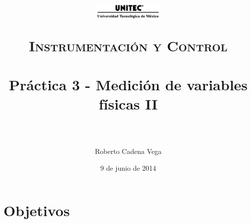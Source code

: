 



\title{	
	\normalfont \normalsize
	\begin{figure}[h]
		\begin{center}
			\includegraphics[width=0.3\textwidth]{../images/UNITEC.png} %
		\end{center}
	\end{figure}
	\textsc{Instrumentación y Control} \\ [25pt]
	\horrule{0.5pt} \\[0.4cm] %
	\huge Práctica 3 - Medición de variables físicas II \\ %
	\horrule{2pt} \\[0.5cm] %
}

\author{Roberto Cadena Vega} %

\date{\normalsize 9 de junio de 2014} %




\maketitle %


\section{Objetivos}

